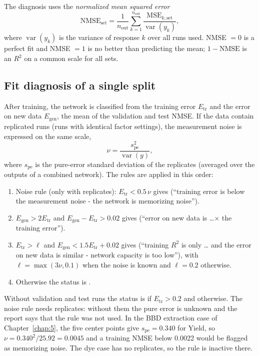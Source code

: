 The diagnosis uses the \emph{normalized mean squared error}
\begin{equation}
  \text{NMSE}_\text{set} = \frac{1}{n_\text{out}}\sum_{k=1}^{n_\text{out}}
  \frac{\text{MSE}_{k,\text{set}}}{\operatorname{var}(y_k)}, \label{eq:ch07-nmse}
\end{equation}
where $\operatorname{var}(y_k)$ is the variance of response $k$ over all runs used. NMSE $=0$ is a perfect fit and
NMSE $=1$ is no better than predicting the mean; $1-\text{NMSE}$ is an $R^2$ on a common scale for all sets.

\subsection{Fit diagnosis of a single split}\label{sec:ch07-diagnose}

After training, the network is classified from the training error $E_\text{tr}$ and the error on new data
$E_\text{gen}$, the mean of the validation and test NMSE. If the data contain replicated runs (runs with identical
factor settings), the measurement noise is expressed on the same scale,
\begin{equation}
  \nu = \frac{s_\text{pe}^2}{\operatorname{var}(y)}, \label{eq:ch07-noise}
\end{equation}
where $s_\text{pe}$ is the pure-error standard deviation of the replicates (averaged over the outputs of a combined
network). The rules are applied in this order:
\begin{enumerate}
  \item Noise rule (only with replicates): $E_\text{tr} < 0.5\,\nu$ gives  (``training error is
    below the measurement noise - the network is memorizing noise'').
  \item $E_\text{gen} > 2E_\text{tr}$ and $E_\text{gen} - E_\text{tr} > 0.02$ gives  (``error on
    new data is \dots{}× the training error'').
  \item $E_\text{tr} > \ell$ and $E_\text{gen} < 1.5E_\text{tr} + 0.02$ gives  (``training $R^2$
    is only \dots{} and the error on new data is similar - network capacity is too low''), with $\ell = \max(3\nu,
    0.1)$ when the noise is known and $\ell = 0.2$ otherwise.
  \item Otherwise the status is .
\end{enumerate}
Without validation and test runs the status is  if $E_\text{tr} > 0.2$ and  otherwise. The noise rule needs replicates: without them the pure error is unknown and the report
says that the rule was not used. In the BBD extraction case of Chapter~\ref{chap:5}, the five center points give $s_\text{pe}
= 0.340$ for Yield, so $\nu = 0.340^2/25.92 = 0.0045$ and a training NMSE below 0.0022 would be flagged as
memorizing noise. The dye case has no replicates, so the rule is inactive there.

